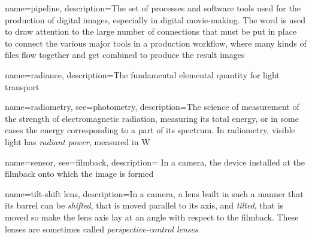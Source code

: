 {
	name={pipeline},
	description={The set of processes and software tools used for the production of 
		digital images, especially in digital movie-making. The word is used to draw
		attention to the large number of connections that must be put in place to 
		connect the various major tools in a production workflow, where many kinds
		of files flow together and get combined to produce the result images}
}

{
	name=radiance,
	description={The fundamental elemental quantity for light transport}
}

{
	name={radiometry},
	see={photometry},
	description={The science of measurement of the strength of electromagnetic radiation,
		measuring its total energy, or in some cases the energy corresponding to a part of
		its spectrum. In radiometry, visible light has \textsl{radiant power},
		measured in \unit{\watt}}
}

{
	name=sensor,
	see={filmback},
	description={
		In a camera, the device installed at the filmback onto which the image is formed}
}

{
	name={tilt-shift lens},
	description={In a camera, a lens built in such a manner that its barrel can be \emph{shifted},
		that is moved parallel to its axis, and \emph{tilted}, that is moved so make the lens axis 
		lay at an angle with respect to the filmback. These lenses are sometimes called
		\emph{perspective-control lenses}}
}


